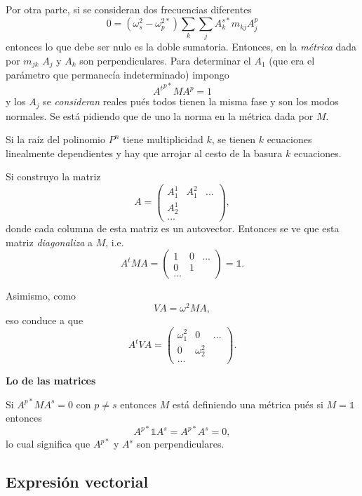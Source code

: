 \documentclass[10pt,oneside]{CBFT_book}
\begin{document}
Por otra parte, si se consideran dos frecuencias diferentes
\[
	0 = ( \omega^2_s - \omega^{2*}_p ) \sum_k \sum_j  A_k^{s*} m_{kj} A_j^{p}
\]
entonces lo que debe ser nulo es la doble sumatoria. Entonces, en la {\it métrica} dada por $m_{jk}$ $A_j$ y $A_k$
son perpendiculares.
Para determinar el $A_1$ (que era el parámetro que permanecía indeterminado) impongo
\[
	{A^t}^{p*} M A^p = 1
\]
y los $A_j$ se {\it consideran} reales pués todos tienen la misma fase y son los modos normales.
Se está pidiendo que de uno la norma en la métrica dada por $M$.

Si la raíz del polinomio $P^n$ tiene multiplicidad $k$, se tienen $k$ ecuaciones linealmente dependientes y hay que
arrojar al cesto de la basura $k$ ecuaciones.

Si construyo la matriz
\[
	A = \begin{pmatrix}
	A_1^1 & A_1^2 & ... \\
	A_2^1 &       &      \\
	...
	\end{pmatrix},
\]
donde cada columna de esta matriz es un autovector. Entonces se ve que esta matriz {\it diagonaliza} a $M$, i.e.
\[
	A^t M A = \begin{pmatrix}
	1 & 0 & ... \\
	0 &  1  &      \\
	...
	\end{pmatrix} = \mathbb{1}.
\]

Asimismo, como 
\[
	V A = \omega^2 M A,
\]
eso conduce a que 
\[
	A^t V A = \begin{pmatrix}
	\omega_1^2 & 0 & ... \\
	0 &  \omega_2^2  &      \\
	...
	\end{pmatrix}.
\]

\begin{ejemplo}{\bf Lo de las matrices}

Si $ A^{p*} M A^s =0 $ con $ p \neq s $ entonces $M$ está definiendo una métrica pués si $ M = \mathbb{1} $ entonces
\[
	A^{p*} \mathbb{1} A^s = A^{p*} A^s = 0,
\]
lo cual significa que $A^{p*}$ y $ A^s$ son perpendiculares.
 
\end{ejemplo}

\subsection{Expresión vectorial}
\end{document}
